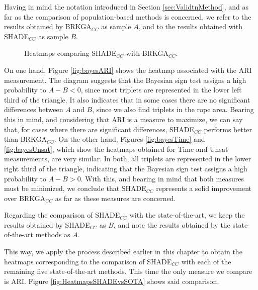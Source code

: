 Having in mind the notation introduced in Section \ref{sec:ValidtnMethod}, and as far as the comparison of population-based methods is concerned, we refer to the results obtained by \acs{BRKGA}$_{CC}$ as sample $A$, and to the results obtained with \acs{SHADE}$_{CC}$ as sample $B$.


\begin{figure}[bth]
	\myfloatalign
	 \quad
	\caption{Heatmaps comparing \acs{SHADE}$_{CC}$ with \acs{BRKGA}$_{CC}$.}
	\label{fig:HeatmapsSHADEvsBRKGA}
\end{figure}

On one hand, Figure \ref{fig:bayesARI} shows the heatmap associated with the \acs{ARI} measurement. The diagram suggests that the Bayesian sign test assigns a high probability to $A - B < 0$, since most triplets are represented in the lower left third of the triangle. It also indicates that in some cases there are no significant differences between $A$ and $B$, since we also find triplets in the rope area. Bearing this in mind, and considering that \acs{ARI} is a measure to maximize, we can say that, for cases where there are significant differences, \acs{SHADE}$_{CC}$ performs better than \acs{BRKGA}$_{CC}$. On the other hand, Figures \ref{fig:bayesTime} and \ref{fig:bayesUnsat}, which show the heatmaps obtained for Time and Unsat measurements, are very similar. In both, all triplets are represented in the lower right third of the triangle, indicating that the Bayesian sign test assigns a high probability to $A - B > 0$. With this, and bearing in mind that both measures must be minimized, we conclude that \acs{SHADE}$_{CC}$ represents a solid improvement over \acs{BRKGA}$_{CC}$ as far as these measures are concerned.

Regarding the comparison of \acs{SHADE}$_{CC}$ with the state-of-the-art, we keep the results obtained by \acs{SHADE}$_{CC}$ as $B$, and note the results obtained by the state-of-the-art methods as $A$.

This way, we apply the process described earlier in this chapter to obtain the heatmaps corresponding to the comparison of \acs{SHADE}$_{CC}$ with each of the remaining five state-of-the-art methods. This time the only measure we compare is \acs{ARI}. Figure \ref{fig:HeatmapsSHADEvsSOTA} shows said comparison.

